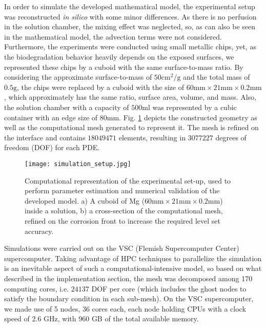 In order to simulate the developed mathematical model, the experimental setup was reconstructed \textit{in silico} with some minor differences. As there is no perfusion in the solution chamber, the mixing effect was neglected, so, as can also be seen in the mathematical model, the advection terms were not considered. Furthermore, the experiments were conducted using small metallic chips, yet, as the biodegradation behavior heavily depends on the exposed surfaces, we represented these chips by a cuboid with the same surface-to-mass ratio. By considering the approximate surface-to-mass of $50 \mathrm{cm}^2/\mathrm{g}$ and the total mass of $0.5 \mathrm{g}$, the chips were replaced by a cuboid with the size of $60\mathrm{mm} \times 21\mathrm{mm} \times 0.2 \mathrm{mm}$, which approximately has the same ratio, surface area, volume, and mass. Also, the solution chamber with a capacity of $500 \mathrm{ml}$ was represented by a cubic container with an edge size of $80 \mathrm{mm}$. Fig. \ref{fig:simulation_setup} depicts the constructed geometry as well as the computational mesh generated to represent it. The mesh is refined on the interface and contains $\num{18049471}$ elements, resulting in $\num{3077227}$ degrees of freedom (DOF) for each PDE.

\begin{figure}[h]
\centering
\medskip
\texttt{[image: simulation\_setup.jpg]}
\caption[Simulation setup of the biodegradation tests]{Computational representation of the experimental set-up, used to perform parameter estimation and numerical validation of the developed model. a) A cuboid of Mg ($60 \mathrm{mm} \times 21 \mathrm{mm} \times 0.2 \mathrm{mm}$) inside a solution, b) a cross-section of the computational mesh, refined on the corrosion front to increase the required level set accuracy.} \label{fig:simulation_setup}
\end{figure}

Simulations were carried out on the VSC (Flemish Supercomputer Center) supercomputer. Taking advantage of HPC techniques to parallelize the simulation is an inevitable aspect of such a computational-intensive model, so based on what described in the implementation section, the mesh was decomposed among 170 computing cores, i.e. $\num{24137}$ DOF per core (which includes the ghost nodes to satisfy the boundary condition in each sub-mesh). On the VSC supercomputer, we made use of 5 nodes, 36 cores each, each node holding CPUs with a clock speed of 2.6 GHz, with 960 GB of the total available memory.

